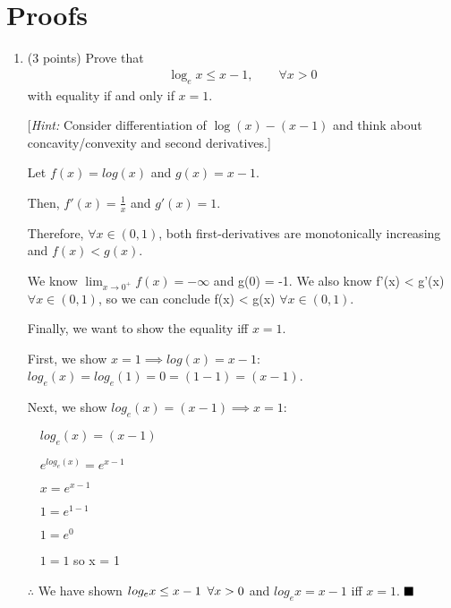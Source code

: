 \section{Proofs}

\begin{enumerate}[resume]
\item (3 points) Prove that
%
\begin{align}
\log_e x\leq x-1, \qquad \forall x>0
\end{align}
%
with equality if and only if $x=1$.

[\emph{Hint:} Consider differentiation of $\log(x)-(x-1)$ and think about concavity/convexity and second derivatives.]

Let $f(x) = log(x)$ and $g(x) = x-1$.

Then, $f'(x) = \frac{1}{x}$ and $g'(x) = 1$.

Therefore, $\forall x \in (0, 1)$, both first-derivatives are monotonically increasing and $f(x) < g(x)$.

We know $\lim_{x\to 0^+}f(x) = -\infty$ and g(0) = -1. We also know f'(x) < g'(x) $\forall x \in (0, 1)$, so we can conclude f(x) < g(x) $\forall x \in (0, 1)$.

Finally, we want to show the equality iff $x = 1$. 

First, we show $x = 1 \implies log(x) = x-1$: $log_e(x) = log_e(1) = 0 = (1 - 1) = (x - 1)$.

Next, we show $log_e(x) = (x-1) \implies x = 1$: 

$\quad log_e(x) = (x-1)$
	
$\quad e^{log_e(x)} = e^{x-1}$

$\quad x = e^{x-1}$

$\quad 1 = e^{1-1}$

$\quad 1 = e^0$

$\quad 1 = 1$ so x = 1

$\therefore$ We have shown $log_e x \leq x - 1 \thinspace\thinspace\thinspace \forall x > 0$ and $log_e x = x - 1$ iff $x = 1$. $\hfill\ensuremath{\blacksquare}$


\end{enumerate}
